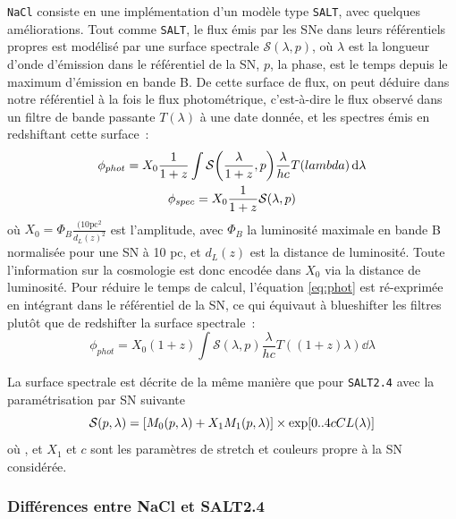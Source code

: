 \documentclass{book}
\def\nacl{\texttt{NaCl}\xspace}
\def\saltd{\texttt{SALT2.4}\xspace}
\let\mcl\mathcal
\begin{document}
\nacl consiste en une implémentation d'un modèle type \texttt{SALT}, avec quelques améliorations. Tout comme \texttt{SALT}, le flux émis par les SNe dans leurs référentiels propres est modélisé par une surface spectrale $\mcl S(\lambda, p)$, où $\lambda$ est la longueur d'onde d'émission dans le référentiel de la SN, $p$, la phase, est le temps depuis le maximum d'émission en bande B.
De cette surface de flux, on peut déduire dans notre référentiel à la fois le flux photométrique, c'est-à-dire le flux observé dans un filtre de bande passante $T(\lambda)$ à une date donnée, et les spectres émis en redshiftant cette surface~:
\begin{gather}
	\phi_{phot} = X_0 \frac{1}{1+z} \int \mcl S\qty(\frac{\lambda}{1+z}, p) \frac{\lambda}{hc} T(lambda) \dd{\lambda} \label{eq:phot}\\
	\phi_{spec}  = X_0 \frac{1}{1+z} \mcl S(\lambda, p) \label{eq:spec}
\end{gather}
où $X_0 = \Phi_B \frac{(10\text{pc}^2}{d_L(z)^2}$ est l'amplitude, avec $\Phi_B$ la luminosité maximale en bande B normalisée pour une SN à 10 pc, et $d_L(z)$ est la distance de luminosité. Toute l'information sur la cosmologie est donc encodée dans $X_0$ via la distance de luminosité.
Pour réduire le temps de calcul, l'équation \ref{eq:phot} est ré-exprimée en intégrant dans le référentiel de la SN, ce qui équivaut à blueshifter les filtres plutôt que de redshifter la surface spectrale~:
\begin{equation}
	\phi_{phot} = X_0 (1+z) \int \mcl S(\lambda, p) \frac{\lambda}{hc} T((1+z)\lambda) \dd{\lambda}
\end{equation}

La surface spectrale est décrite de la même manière que pour \saltd avec la paramétrisation par SN suivante
\begin{equation}
    \mcl S (p, \lambda) = \qty[M_0(p, \lambda) + X_1 M_1(p, \lambda)] \times \exp[0..4 c CL(\lambda)]
\end{equation}
où , et $X_1$ et $c$ sont les paramètres de stretch et couleurs propre à la SN considérée.

\subsubsection{Différences entre NaCl et SALT2.4}
\end{document}
